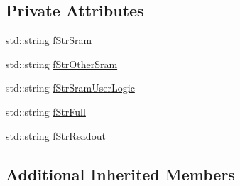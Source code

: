 \subsection*{Private Attributes}
\begin{DoxyCompactItemize}
\item 
std\-::string \hyperlink{class_ph2___hw_interface_1_1_cbc_interface_aaddc36b6ef3360c0a99da44c53a3242f}{f\-Str\-Sram}
\item 
std\-::string \hyperlink{class_ph2___hw_interface_1_1_cbc_interface_a3277ad84e5806e7992563dbb6122fdb9}{f\-Str\-Other\-Sram}
\item 
std\-::string \hyperlink{class_ph2___hw_interface_1_1_cbc_interface_a61c9447688cc556e33d7051c26459755}{f\-Str\-Sram\-User\-Logic}
\item 
std\-::string \hyperlink{class_ph2___hw_interface_1_1_cbc_interface_a72fbeb3befe9e533fc21cc568e540df4}{f\-Str\-Full}
\item 
std\-::string \hyperlink{class_ph2___hw_interface_1_1_cbc_interface_ade4f2642613500ee5f1963c22509c48b}{f\-Str\-Readout}
\end{DoxyCompactItemize}
\subsection*{Additional Inherited Members}


